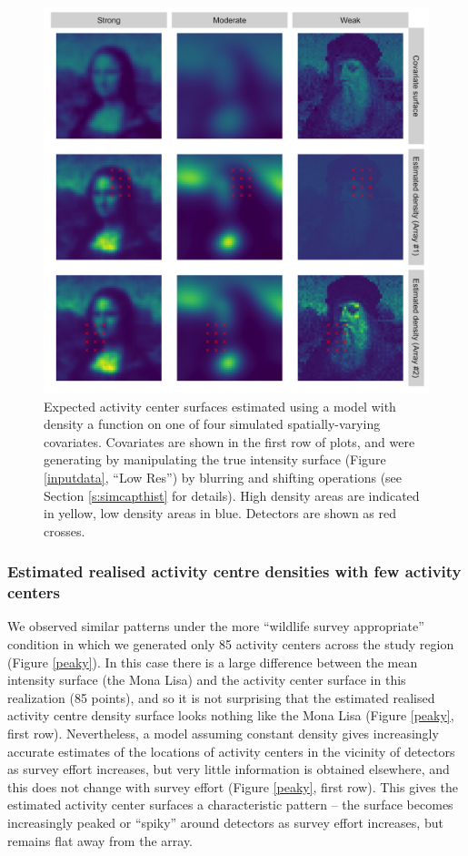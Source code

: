\documentclass[10pt,a4paper]{article}
\begin{document}
\begin{figure}[htbp]
\centering
\includegraphics[width=1\textwidth]{mona_covariates.png}
\caption{Expected activity center surfaces estimated using a model with density a function on one of four simulated spatially-varying covariates. Covariates are shown in the first row of plots, and were generating by manipulating the true intensity surface (Figure \ref{inputdata}, ``Low Res'') by blurring and shifting operations (see Section \ref{s:simcapthist} for details). High density areas are indicated in yellow, low density areas in blue. Detectors are shown as red crosses.} 
\label{covariates}
\end{figure}

\subsubsection{Estimated realised activity centre densities with few activity centers}

We observed similar patterns under the more ``wildlife survey appropriate'' condition in which we generated only 85 activity centers across the study region (Figure \ref{peaky}). In this case there is a large difference between the mean intensity surface (the Mona Lisa) and the activity center surface in this realization (85 points), and so it is not surprising that the estimated realised activity centre density surface looks nothing like the Mona Lisa (Figure \ref{peaky}, first row). Nevertheless, a model assuming constant density gives increasingly accurate estimates of the locations of activity centers in the vicinity of detectors as survey effort increases, but very little information is obtained elsewhere, and this does not change with survey effort (Figure \ref{peaky}, first row). This gives the estimated activity center surfaces a characteristic pattern -- the surface becomes increasingly peaked or ``spiky'' around detectors as survey effort increases, but remains flat away from the array. 
\end{document}
